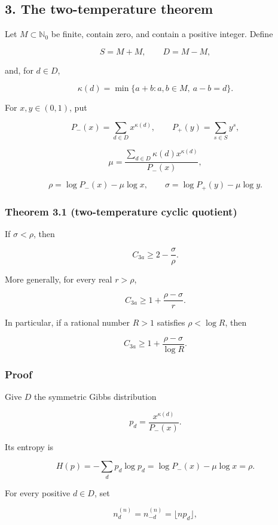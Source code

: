 \documentclass[
  10pt,
]{article}
\begin{document}
\subsection{3. The two-temperature
theorem}\label{the-two-temperature-theorem}

Let \(M\subset\mathbb N_0\) be finite, contain zero, and contain a
positive integer. Define

\[
S=M+M,\qquad D=M-M,
\]

and, for \(d\in D\),

\[
\kappa(d)=\min\{a+b:a,b\in M,\ a-b=d\}.
\]

For \(x,y\in(0,1)\), put

\[
P_-(x)=\sum_{d\in D}x^{\kappa(d)},
\qquad
P_+(y)=\sum_{s\in S}y^s,
\]

\[
\mu=
\frac{\sum_{d\in D}\kappa(d)x^{\kappa(d)}}{P_-(x)},
\]

\[
\rho=\log P_-(x)-\mu\log x,
\qquad
\sigma=\log P_+(y)-\mu\log y.
\]

\subsubsection{Theorem 3.1 (two-temperature cyclic
quotient)}\label{theorem-3.1-two-temperature-cyclic-quotient}

If \(\sigma<\rho\), then

\[
\boxed{
C_{3a}\ge2-\frac{\sigma}{\rho}.
}
\tag{3.1}
\]

More generally, for every real \(r>\rho\),

\[
\boxed{
C_{3a}\ge1+\frac{\rho-\sigma}{r}.
}
\tag{3.2}
\]

In particular, if a rational number \(R>1\) satisfies \(\rho<\log R\),
then

\[
\boxed{
C_{3a}\ge1+\frac{\rho-\sigma}{\log R}.
}
\tag{3.3}
\]

\subsubsection{Proof}\label{proof-1}

Give \(D\) the symmetric Gibbs distribution

\[
p_d=\frac{x^{\kappa(d)}}{P_-(x)}.
\]

Its entropy is

\[
H(p)=-\sum_dp_d\log p_d
=\log P_-(x)-\mu\log x
=\rho.
\]

For every positive \(d\in D\), set

\[
n_d^{(n)}=n_{-d}^{(n)}=\lfloor np_d\rfloor,
\]
\end{document}
